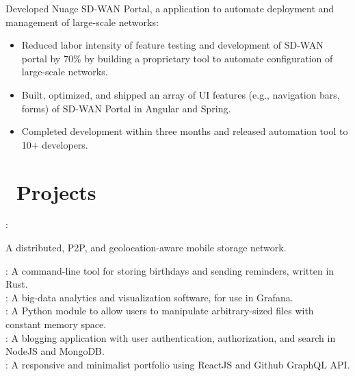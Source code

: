 \documentclass{resume}
\begin{document}
{  
  Developed Nuage SD-WAN Portal, a application to automate deployment and management of large-scale networks:
  \begin{itemize}
    \item {Reduced labor intensity of feature testing and development of SD-WAN portal by 70\%
          by building a proprietary tool to automate configuration of large-scale networks.}
    \item {Built, optimized, and shipped an array of UI features (e.g., navigation bars, forms) of SD-WAN Portal in Angular and Spring.}
    \item {Completed development within three months and released automation tool to 10+ developers.}
  \end{itemize}

  \par
 }

\section{\faCodeFork\ Projects}
{
\fontsize{10.5pt}{2}\selectfont
\onehalfspacing
{}: {\fontsize{10.8pt}{2}\selectfont A distributed, P2P, and geolocation-aware mobile storage network.\\ \par}
: A command-line tool for storing birthdays and sending reminders, written in Rust. \\
: A big-data analytics and visualization software, for use in Grafana. \\
: A Python module to allow users to manipulate arbitrary-sized files with constant memory space. \\
: A blogging application with user authentication, authorization, and search in NodeJS and MongoDB. \\
: A responsive and minimalist portfolio using ReactJS and Github GraphQL API. \\
\par
}


%
%
\end{document}
